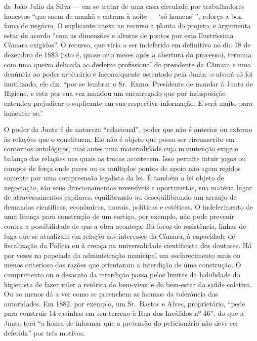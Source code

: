 de João Julio da Silva --- em se tratar de uma casa circulada por
trabalhadores honestos ``que saem de manhã e entram à noite --- `só
homens'\,'', reforça a boa fama do negócio. O suplicante anexa ao
recurso a planta do projeto, e argumenta estar de acordo ``com as
dimensões e alturas de pontos por esta Ilustríssima Câmara exigidos''. O
recurso, que viria a ser indeferido em definitivo no dia 18 de dezembro
de 1883 (isto é, quase oito meses após a abertura do processo), termina
com uma queixa delicada ao desleixo profissional do presidente da Câmara
e uma denúncia ao poder arbitrário e inconsequente ostentado pela Junta:
o alvará só foi inutilizado, ele diz, ``por se lembrar o Sr.~Exmo.
Presidente de mandar à Junta de Higiene, e esta por sua vez mandou um
encarregado que por indisposição entendeu prejudicar o suplicante em sua
respectiva informação. E será muito para lamentar-se.''

O poder da Junta é de natureza ``relacional'', poder que não é anterior
ou externo às relações que o constituem. Ele não é objeto que possa ser
circunscrito em contornos ontológicos, mas antes uma materialidade cuja
manutenção exige o balanço das relações nas quais as trocas acontecem.
Isso permite intuir jogos ou campos de força onde pares ou os múltiplos
pontos de apoio não agem regidos somente por uma compreensão legalista
da lei. É também a lei objeto de negociação, são seus direcionamentos
reversíveis e oportunistas, sua matéria lugar de atravessamentos
capilares, equilibrando ou desequilibrando um arranjo de demandas
científicas, econômicas, morais, políticas e estéticas. O indeferimento
de uma licença para construção de um cortiço, por exemplo, não pode
prevenir contra a possibilidade de que a obra aconteça. Há focos de
resistência, linhas de fuga que se atualizam em relação aos interesses
da Câmara, à capacidade de fiscalização da Polícia ou à crença na
universalidade cientificista dos doutores. Há por vezes na papelada da
administração municipal um esclarecimento mais ou menos criterioso das
razões que orientaram a interdição de uma construção. O cumprimento ou o
desacato da interdição passa pelos limites da habilidade do higienista
de fazer valer a retórica do bem-viver e do bem-estar da saúde coletiva.
Ou ao menos dá a ver como se preenchem as lacunas da tolerância das
autoridades. Em 1882, por exemplo, um Sr.~Bastos e Alves, proprietário,
``pede para construir 14 casinhas em seu terreno à Rua dos Inválidos nº
46'', do que a Junta terá ``a honra de informar que a pretensão do
peticionário não deve ser deferida'' por três motivos:

